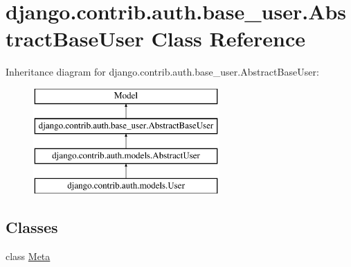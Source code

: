 \hypertarget{classdjango_1_1contrib_1_1auth_1_1base__user_1_1_abstract_base_user}{}\section{django.\+contrib.\+auth.\+base\+\_\+user.\+Abstract\+Base\+User Class Reference}
\label{classdjango_1_1contrib_1_1auth_1_1base__user_1_1_abstract_base_user}
Inheritance diagram for django.\+contrib.\+auth.\+base\+\_\+user.\+Abstract\+Base\+User\+:\begin{figure}[H]
\begin{center}
\leavevmode
\includegraphics[height=4.000000cm]{classdjango_1_1contrib_1_1auth_1_1base__user_1_1_abstract_base_user}
\end{center}
\end{figure}
\subsection*{Classes}
\begin{DoxyCompactItemize}
\item 
class \mbox{\hyperlink{classdjango_1_1contrib_1_1auth_1_1base__user_1_1_abstract_base_user_1_1_meta}{Meta}}
\end{DoxyCompactItemize}
